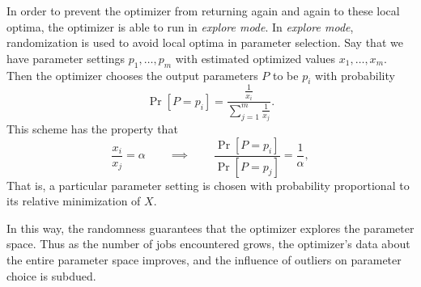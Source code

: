 In order to prevent the optimizer from returning again and again to
these local optima, the optimizer is able to run in {\em explore mode}. 
In {\em explore mode}, randomization is
used to avoid local optima in parameter selection. Say that we have 
parameter settings $p_1, \ldots, p_m$ with estimated optimized values 
$x_1, \ldots, x_m$. Then the optimizer chooses the output parameters $P$ 
to be $p_i$ with probability
\[
\Pr[P = p_i] = \frac{\frac{1}{x_i}}{\sum_{j = 1}^m \frac{1}{x_j}}.
\]
This scheme has the property that 
\[
\frac{x_i}{x_j} = \alpha\qquad \implies \qquad \frac{\Pr[P = p_i]}{\Pr[P = p_j]} = \frac{1}{\alpha},
\]
That is, a 
particular parameter setting is chosen with probability proportional 
to its relative minimization of $X$.

In this way, the randomness guarantees that the optimizer explores the 
parameter space. Thus as the number of jobs encountered grows, 
the optimizer's data about the entire parameter space improves, and the
influence of outliers on parameter choice is subdued. 


